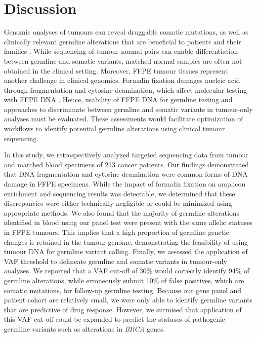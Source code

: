 
\chapter{Discussion}
\label{ch:Discussion}


Genomic analyses of tumours can reveal druggable somatic mutations, as well as clinically relevant germline alterations that are beneficial to patients and their families \cite{Meric-Bernstam2016, Schrader2015, Jones2015a}. While sequencing of tumour-normal pairs can enable differentiation between germline and somatic variants, matched normal samples are often not obtained in the clinical setting. Moreover, FFPE tumour tissues represent another challenge in clinical genomics. Formalin fixation damages nucleic acid through fragmentation and cytosine deamination, which affect molecular testing with FFPE DNA \cite{Do2015a, Kim2017, Ofner2017, Oh2015, Wong2013, Wong2014, Sikorsky2007}. Hence, usability of FFPE DNA for germline testing and approaches to discriminate between germline and somatic variants in tumour-only analyses must be evaluated. These assessments would facilitate optimization of workflows to identify potential germline alterations using clinical tumour sequencing.

In this study, we retrospectively analyzed targeted sequencing data from tumour and matched blood specimens of 213 cancer patients. Our findings demonstrated that DNA fragmentation and cytosine deamination were common forms of DNA damage in FFPE specimens. While the impact of formalin fixation on amplicon enrichment and sequencing results was detectable, we determined that these discrepancies were either technically negligible or could be minimized using appropriate methods. We also found that the majority of germline alterations identified in blood using our panel test were present with the same allelic statuses in FFPE tumours. This implies that a high proportion of germline genetic changes is retained in the tumour genome, demonstrating the feasibility of using tumour DNA for germline variant calling. Finally, we assessed the application of VAF threshold to delineate germline and somatic variants in tumour-only analyses. We reported that a VAF cut-off of 30\% would correctly identify 94\% of germline alterations, while erroneously submit 10\% of false positives, which are somatic mutations, for follow-up germline testing. Because our gene panel and patient cohort are relatively small, we were only able to identify germline variants that are predictive of drug response. However, we surmised that application of this VAF cut-off could be expanded to predict the statuses of pathogenic germline variants such as alterations in \textit{BRCA} genes.


